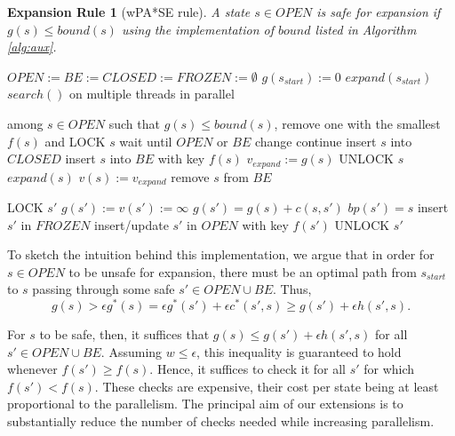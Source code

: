\documentclass[letterpaper]{article}
\newtheorem{rul}{Expansion Rule}
\begin{document}
\begin{rul}[wPA*SE rule]
A state $s\in OPEN$ is safe for expansion if $g(s) \le bound(s)$ using the implementation of $bound$ listed in Algorithm \ref{alg:aux}.
\end{rul}

\begin{algorithm}
\caption{$main()$}
\label{alg:main}
\begin{algorithmic}
\STATE $OPEN := BE := CLOSED := FROZEN := \emptyset$
\STATE $g(s_{start}) := 0$
\STATE $expand(s_{start})$
\STATE $search()$ on multiple threads in parallel
\end{algorithmic}
\end{algorithm}

\begin{algorithm}
\caption{$search()$}
\label{alg:search}
\begin{algorithmic}
\STATE among $s\in OPEN$ such that $g(s) \le bound(s)$, remove one with the smallest $f(s)$ and LOCK $s$
\STATE wait until $OPEN$ or $BE$ change
\STATE continue
\ENDIF
\STATE insert $s$ into $CLOSED$
\STATE insert $s$ into $BE$ with key $f(s)$
\STATE $v_{expand} := g(s)$
\STATE UNLOCK $s$
\STATE $expand(s)$
\STATE $v(s) := v_{expand}$
\STATE remove $s$ from $BE$
\ENDWHILE
\end{algorithmic}
\end{algorithm}

\begin{algorithm}
\caption{$expand(s)$}
\label{alg:expand}
\begin{algorithmic}
\STATE LOCK $s'$
\STATE $g(s') := v(s') := \infty$
\ENDIF
{}
\STATE $g(s') = g(s) + c(s,s')$
\STATE $bp(s') = s$
\STATE insert $s'$ in $FROZEN$
\ELSE
\STATE insert/update $s'$ in $OPEN$ with key $f(s')$
\ENDIF
\ENDIF
\STATE UNLOCK $s'$
\ENDFOR
\end{algorithmic}
\end{algorithm}

To sketch the intuition behind this implementation, we argue that in order for $s\in OPEN$ to be unsafe for expansion, there must be an optimal path from $s_{start}$ to $s$ passing through some safe $s'\in OPEN\cup BE$. Thus,
\[g(s) > \epsilon g^*(s) = \epsilon g^*(s') + \epsilon c^*(s',s) \ge g(s') + \epsilon h(s',s).\]

For $s$ to be safe, then, it suffices that $g(s) \le g(s') + \epsilon h(s', s)$ for all $s'\in OPEN\cup BE$. Assuming $w \le \epsilon$, this inequality is guaranteed to hold whenever $f(s') \ge f(s)$. Hence, it suffices to check it for all $s'$ for which $f(s') < f(s)$. These checks are expensive, their cost per state being at least proportional to the parallelism. The principal aim of our extensions is to substantially reduce the number of checks needed while increasing parallelism.
\end{document}
